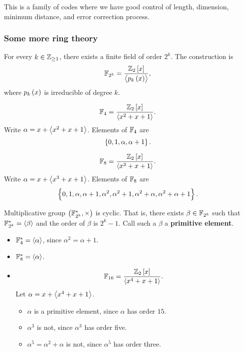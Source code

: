 
This is a family of codes where we have good control of length, dimension, minimum distance, and error correction process.

\subsubsection{Some more ring theory}

\begin{fact*}
For every $ k \in \mathbb{Z}_{\ge 1} $, there exists a finite field of order $ 2^k $. The construction is
$$ \F_{2^k} = \dfrac{\Z_2\sbr{x}}{\abr{p_k\br{x}}}, $$
where $ p_k\br{x} $ is irreducible of degree $ k $.
\end{fact*}

\begin{example*}
$$ \F_4 = \dfrac{\Z_2\sbr{x}}{\abr{x^2 + x + 1}}. $$
Write $ \alpha = x + \left\langle x^2 + x + 1 \right\rangle $. Elements of $ \mathbb{F}_4 $ are
$$ \cbr{0, 1, \alpha, \alpha + 1}. $$
\end{example*}

\begin{example*}
$$ \F_8 = \dfrac{\Z_2\sbr{x}}{\abr{x^3 + x + 1}}. $$
Write $ \alpha = x + \left\langle x^3 + x + 1 \right\rangle $. Elements of $ \mathbb{F}_8 $ are
$$ \cbr{0, 1, \alpha, \alpha + 1, \alpha^2, \alpha^2 + 1, \alpha^2 + \alpha, \alpha^2 + \alpha + 1}. $$
\end{example*}

\begin{fact*}
Multiplicative group $ \br{\F_{2^k}^*, \times} $ is cyclic. That is, there exists $ \beta \in \mathbb{F}_{2^k} $ such that $ \mathbb{F}_{2^k}^* = \left\langle \beta \right\rangle $ and the order of $ \beta $ is $ 2^k - 1 $. Call such a $ \beta $ a \textbf{primitive element}.
\end{fact*}

\begin{example*}
\hfill
\begin{itemize}
\item $ \mathbb{F}_4^* = \left\langle \alpha \right\rangle $, since $ \alpha^2 = \alpha + 1 $.
\item $ \mathbb{F}_8^* = \left\langle \alpha \right\rangle $.
\item
$$ \F_{16} = \dfrac{\Z_2\sbr{x}}{\abr{x^4 + x + 1}}. $$
Let $ \alpha = x + \left\langle x^4 + x + 1 \right\rangle $.
\begin{itemize}
\item $ \alpha $ is a primitive element, since $ \alpha $ has order $ 15 $.
\item $ \alpha^3 $ is not, since $ \alpha^3 $ has order five.
\item $ \alpha^5 = \alpha^2 + \alpha $ is not, since $ \alpha^5 $ has order three.
\end{itemize}
\end{itemize}
\end{example*}

